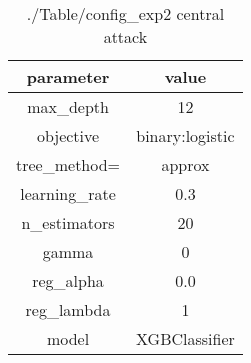\begin{table}[h]
\centering
\begin{tabular}{| c|c|}
\hline
parameter & value\\
\hline
max_depth & 12 \\\hline
objective & binary:logistic \\\hline
tree_method= & approx \\\hline
learning_rate & 0.3 \\\hline
n_estimators & 20 \\\hline
gamma & 0 \\\hline
reg_alpha & 0.0 \\\hline
reg_lambda & 1 \\\hline
model & XGBClassifier \\\hline

\end{tabular}\caption{./Table/config_exp2 central attack}
\label{tab:./Table/config_exp2 central attack}
\end{table}
